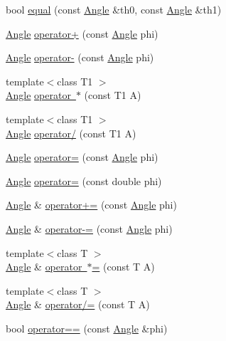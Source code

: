 \begin{DoxyCompactItemize}
bool \mbox{\hyperlink{class_angle_a56b3dfe127d0abc16db14bd22ed4b5b4}{equal}} (const \mbox{\hyperlink{class_angle}{Angle}} \&th0, const \mbox{\hyperlink{class_angle}{Angle}} \&th1)
\item 
\mbox{\hyperlink{class_angle}{Angle}} \mbox{\hyperlink{class_angle_aa04bc36c641e1ecfb7aee5019ed8e6ea}{operator+}} (const \mbox{\hyperlink{class_angle}{Angle}} phi)
\item 
\mbox{\hyperlink{class_angle}{Angle}} \mbox{\hyperlink{class_angle_a951436019a4c06895ba31a08bf0d6fd2}{operator-\/}} (const \mbox{\hyperlink{class_angle}{Angle}} phi)
\item 
{\footnotesize template$<$class T1 $>$ }\\\mbox{\hyperlink{class_angle}{Angle}} \mbox{\hyperlink{class_angle_ab50d514ec9f24c0b65d37f174cbff780}{operator $\ast$}} (const T1 A)
\item 
{\footnotesize template$<$class T1 $>$ }\\\mbox{\hyperlink{class_angle}{Angle}} \mbox{\hyperlink{class_angle_ac72a246e3e3fd5f1c58d2fd89338b1ff}{operator/}} (const T1 A)
\item 
\mbox{\hyperlink{class_angle}{Angle}} \mbox{\hyperlink{class_angle_a93da39f08e2e110e278bb94d1c279ac6}{operator=}} (const \mbox{\hyperlink{class_angle}{Angle}} phi)
\item 
\mbox{\hyperlink{class_angle}{Angle}} \mbox{\hyperlink{class_angle_adf9e68cdeac72b3754bd7d0993a37220}{operator=}} (const double phi)
\item 
\mbox{\hyperlink{class_angle}{Angle}} \& \mbox{\hyperlink{class_angle_a8129646ed5390b538ccf7c19f9213967}{operator+=}} (const \mbox{\hyperlink{class_angle}{Angle}} phi)
\item 
\mbox{\hyperlink{class_angle}{Angle}} \& \mbox{\hyperlink{class_angle_a54a5489837c16a15320f9249d2cabed6}{operator-\/=}} (const \mbox{\hyperlink{class_angle}{Angle}} phi)
\item 
{\footnotesize template$<$class T $>$ }\\\mbox{\hyperlink{class_angle}{Angle}} \& \mbox{\hyperlink{class_angle_aabfd043635f8295cbd08cf50d4388a88}{operator $\ast$=}} (const T A)
\item 
{\footnotesize template$<$class T $>$ }\\\mbox{\hyperlink{class_angle}{Angle}} \& \mbox{\hyperlink{class_angle_ac0421d376bd1c7396088ff465589c4b9}{operator/=}} (const T A)
\item 
bool \mbox{\hyperlink{class_angle_affdc9a2590df21c00fcbe01e5dadaf25}{operator==}} (const \mbox{\hyperlink{class_angle}{Angle}} \&phi)

\end{DoxyCompactItemize}
